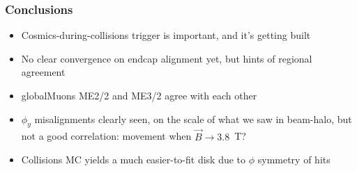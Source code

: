 \documentclass[compress]{beamer}
\begin{document}
\begin{frame}
\frametitle{Conclusions}

\begin{itemize}\setlength{\itemsep}{0.25 cm}
\item Cosmics-during-collisions trigger is important, and it's getting built
\item No clear convergence on endcap alignment yet, but hints of regional agreement
\item globalMuons ME2/2 and ME3/2 agree with each other
\item $\phi_y$ misalignments clearly seen, on the scale of what we saw
  in beam-halo, but not a good correlation: movement when $\vec{B} \to
  3.8$~T?
\item Collisions MC yields a much easier-to-fit disk due to $\phi$ symmetry of hits
\end{itemize}

\label{numpages}
\end{frame}
\end{document}
